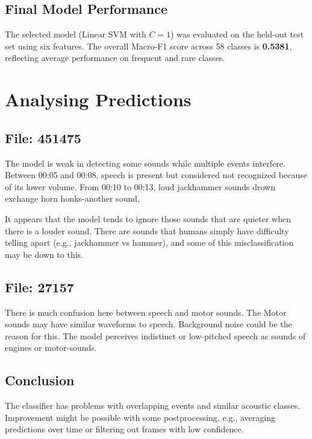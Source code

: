\documentclass{article}
\begin{document}
\subsection{Final Model Performance}
The selected model (Linear SVM with $C=1$) was evaluated on the held-out test set using six features.
The overall Macro-F1 score across 58 classes is \textbf{0.5381}, reflecting average performance on frequent and rare classes.

\section{Analysing Predictions}

\subsection{File: 451475}
The model is weak in detecting some sounds while multiple events interfere. Between 00:05 and 00:08, speech is present but considered not recognized because of its lower volume. From 00:10 to 00:13, loud jackhammer sounds drown exchange horn honks-another sound.

It appears that the model tends to ignore those sounds that are quieter when there is a louder sound. There are sounds that humans simply have difficulty telling apart (e.g., jackhammer vs hammer), and some of this misclassification may be down to this.

\subsection{File: 27157}
There is much confusion here between speech and motor sounds. The Motor sounds may have similar waveforms to speech. Background noise could be the reason for this. The model perceives indistinct or low-pitched speech as sounds of engines or motor-sounds.

\subsection{Conclusion}
The classifier has problems with overlapping events and similar acoustic classes. Improvement might be possible with some postprocessing, e.g., averaging predictions over time or filtering out frames with low confidence.
\end{document}
